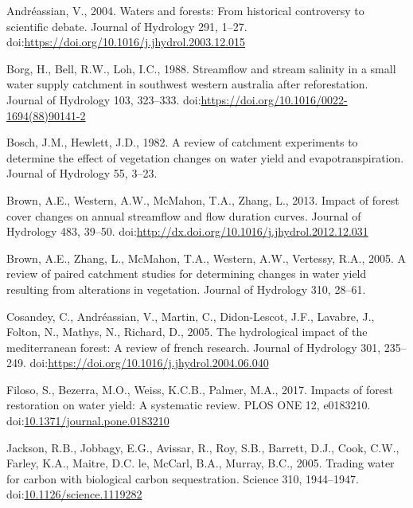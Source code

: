 \documentclass[]{elsarticle} %
\begin{document}
\hypertarget{refs}{}
\leavevmode\hypertarget{ref-andreassian2004}{}%
Andréassian, V., 2004. Waters and forests: From historical controversy
to scientific debate. Journal of Hydrology 291, 1--27.
doi:\href{https://doi.org/https://doi.org/10.1016/j.jhydrol.2003.12.015}{https://doi.org/10.1016/j.jhydrol.2003.12.015}

\leavevmode\hypertarget{ref-borg1988}{}%
Borg, H., Bell, R.W., Loh, I.C., 1988. Streamflow and stream salinity in
a small water supply catchment in southwest western australia after
reforestation. Journal of Hydrology 103, 323--333.
doi:\href{https://doi.org/https://doi.org/10.1016/0022-1694(88)90141-2}{https://doi.org/10.1016/0022-1694(88)90141-2}

\leavevmode\hypertarget{ref-hewlett1984}{}%
Bosch, J.M., Hewlett, J.D., 1982. A review of catchment experiments to
determine the effect of vegetation changes on water yield and
evapotranspiration. Journal of Hydrology 55, 3--23.

\leavevmode\hypertarget{ref-brown2013}{}%
Brown, A.E., Western, A.W., McMahon, T.A., Zhang, L., 2013. Impact of
forest cover changes on annual streamflow and flow duration curves.
Journal of Hydrology 483, 39--50.
doi:\href{https://doi.org/http://dx.doi.org/10.1016/j.jhydrol.2012.12.031}{http://dx.doi.org/10.1016/j.jhydrol.2012.12.031}

\leavevmode\hypertarget{ref-brown2005}{}%
Brown, A.E., Zhang, L., McMahon, T.A., Western, A.W., Vertessy, R.A.,
2005. A review of paired catchment studies for determining changes in
water yield resulting from alterations in vegetation. Journal of
Hydrology 310, 28--61.

\leavevmode\hypertarget{ref-cosandey2005}{}%
Cosandey, C., Andréassian, V., Martin, C., Didon-Lescot, J.F., Lavabre,
J., Folton, N., Mathys, N., Richard, D., 2005. The hydrological impact
of the mediterranean forest: A review of french research. Journal of
Hydrology 301, 235--249.
doi:\href{https://doi.org/https://doi.org/10.1016/j.jhydrol.2004.06.040}{https://doi.org/10.1016/j.jhydrol.2004.06.040}

\leavevmode\hypertarget{ref-filoso2017}{}%
Filoso, S., Bezerra, M.O., Weiss, K.C.B., Palmer, M.A., 2017. Impacts of
forest restoration on water yield: A systematic review. PLOS ONE 12,
e0183210.
doi:\href{https://doi.org/10.1371/journal.pone.0183210}{10.1371/journal.pone.0183210}

\leavevmode\hypertarget{ref-jackson2005}{}%
Jackson, R.B., Jobbagy, E.G., Avissar, R., Roy, S.B., Barrett, D.J.,
Cook, C.W., Farley, K.A., Maitre, D.C. le, McCarl, B.A., Murray, B.C.,
2005. Trading water for carbon with biological carbon sequestration.
Science 310, 1944--1947.
doi:\href{https://doi.org/10.1126/science.1119282}{10.1126/science.1119282}
\end{document}
